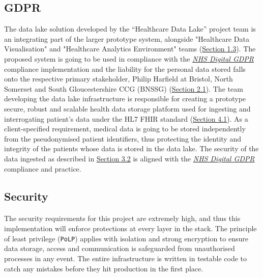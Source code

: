 \documentclass[10pt]{article}
\begin{document}
\subsection{GDPR}
The data lake solution developed by the “Healthcare Data Lake” project team is an integrating part of the larger prototype system, alongside "Healthcare Data Visualisation" and "Healthcare Analytics Environment" teams (\hyperref[sec:project]{Section 1.3}). The proposed system is going to be used in compliance with the \href{https://digital.nhs.uk/about-nhs-digital/our-work/keeping-patient-data-safe/gdpr}{\emph{NHS Digital GDPR}} compliance implementation and the liability for the personal data stored falls onto the respective primary stakeholder, Philip Harfield at Bristol, North Somerset and South Gloucestershire CCG (BNSSG) (\hyperref[primary-stakeholder-and-user-story]{Section 2.1}). The team developing the data lake infrastructure is responsible for creating a prototype secure, robust and scalable health data storage platform used for ingesting and interrogating patient’s data under the HL7 FHIR standard (\hyperref[arch:intro]{Section 4.1}). As a client-specified requirement, medical data is going to be stored independently from the pseudonymised patient identifiers, thus protecting the identity and integrity of the patients whose data is stored in the data lake. The security of the data ingested as described in \hyperref[sec:security]{Section 3.2} is aligned with the \href{https://digital.nhs.uk/about-nhs-digital/our-work/keeping-patient-data-safe/gdpr}{\emph{NHS Digital GDPR}} compliance and practice.

\subsection{Security}
\label{sec:security}
\paragraph{}
The security requirements for this project are extremely high, and thus this implementation will enforce protections at every layer in the stack. The principle of least privilege (\texttt{PoLP}) applies with isolation and strong encryption to ensure data storage, access and communication is safeguarded from unauthorised processes in any event. The entire infrastructure is written in testable code to catch any mistakes before they hit production in the first place.
\end{document}

